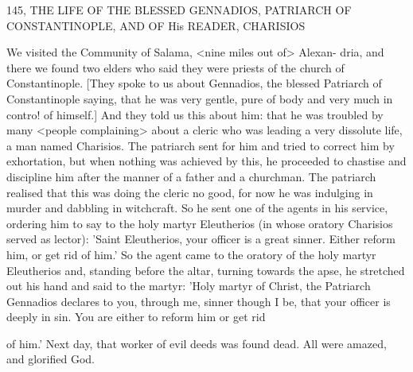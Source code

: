 145, THE LIFE OF THE BLESSED GENNADIOS,
PATRIARCH OF CONSTANTINOPLE,
AND OF His READER, CHARISIOS

We visited the Community of Salama, <nine miles out of> Alexan-
dria, and there we found two elders who said they were priests of
the church of Constantinople. [They spoke to us about Gennadios,
the blessed Patriarch of Constantinople saying, that he was very
gentle, pure of body and very much in contro! of himself.] And they
told us this about him: that he was troubled by many <people
complaining> about a cleric who was leading a very dissolute life,
a man named Charisios. The patriarch sent for him and tried to
correct him by exhortation, but when nothing was achieved by this,
he proceeded to chastise and discipline him after the manner of a
father and a churchman. The patriarch realised that this was doing
the cleric no good, for now he was indulging in murder and
dabbling in witchcraft. So he sent one of the agents in his service,
ordering him to say to the holy martyr Eleutherios (in whose
oratory Charisios served as lector): 'Saint Eleutherios, your officer
is a great sinner. Either reform him, or get rid of him.' So the agent
came to the oratory of the holy martyr Eleutherios and, standing
before the altar, turning towards the apse, he stretched out his hand
and said to the martyr: 'Holy martyr of Christ, the Patriarch
Gennadios declares to you, through me, sinner though I be, that
your officer is deeply in sin. You are either to reform him or get rid

of him.' Next day, that worker of evil deeds was found dead. All
were amazed, and glorified God.

